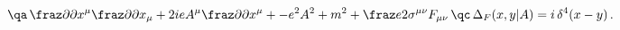 \begin{equation}
\qa\,\fraz \partial{\partial x^\mu} \fraz\partial{\partial
x_\mu}+2ie
 A^\mu
\fraz \partial{\partial x^\mu}+-e^2A^2+m^2+\fraz e 2
 \sigma^{\mu\nu}F_{\mu\nu}
\,\qc\,\Delta_F(x,y|A)=i\,\delta^4(x-y)\,.
\end{equation}

